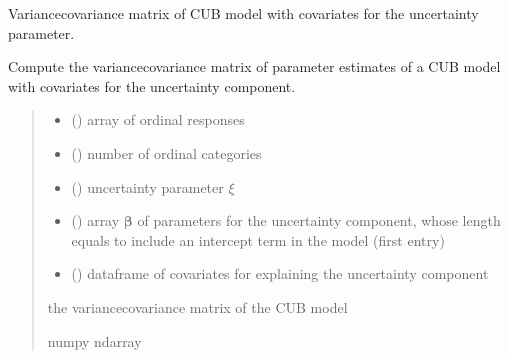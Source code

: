 \documentclass[letterpaper,10pt,english]{sphinxmanual}
\begin{document}
\begin{fulllineitems}
\label{\detokenize{cubmods:cubmods.cub_y0.varcov}}
\pysigstartsignatures
{}
\pysigstopsignatures
\sphinxAtStartPar
Variance\sphinxhyphen{}covariance matrix of CUB model with covariates for the uncertainty parameter.

\sphinxAtStartPar
Compute the variance\sphinxhyphen{}covariance matrix of parameter estimates of a CUB model with 
covariates for the uncertainty component.
\begin{quote}\begin{description}
\begin{itemize}
\item {} 
\sphinxAtStartPar
{} () \textendash{} array of ordinal responses

\item {} 
\sphinxAtStartPar
{} () \textendash{} number of ordinal categories

\item {} 
\sphinxAtStartPar
{} () \textendash{} uncertainty parameter \(\xi\)

\item {} 
\sphinxAtStartPar
{} () \textendash{} array \(\pmb \beta\) of parameters for the uncertainty component, whose length equals 
 to include an intercept term in the model (first entry)

\item {} 
\sphinxAtStartPar
{} () \textendash{} dataframe of covariates for explaining the uncertainty component

\end{itemize}

\sphinxAtStartPar
the variance\sphinxhyphen{}covariance matrix of the CUB model

\sphinxAtStartPar
numpy ndarray

\end{description}\end{quote}

\end{fulllineitems}
\end{document}
